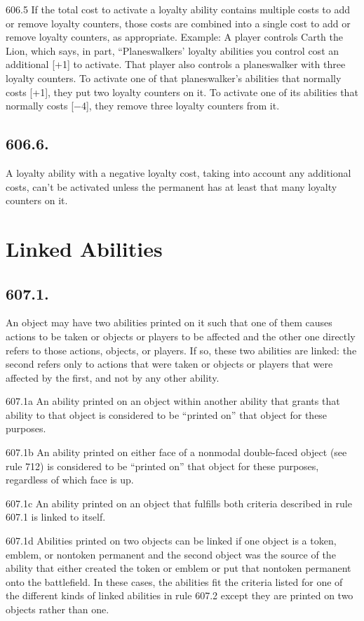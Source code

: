 606.5 If the total cost to activate a loyalty ability contains multiple costs to add or remove loyalty counters, those costs are combined into a single cost to add or remove loyalty counters, as appropriate.
Example: A player controls Carth the Lion, which says, in part, “Planeswalkers’ loyalty abilities you control cost an additional [+1] to activate. That player also controls a planeswalker with three loyalty counters. To activate one of that planeswalker’s abilities that normally costs [+1], they put two loyalty counters on it. To activate one of its abilities that normally costs [−4], they remove three loyalty counters from it.

\subsection*{606.6.}
A loyalty ability with a negative loyalty cost, taking into account any additional costs, can’t be activated unless the permanent has at least that many loyalty counters on it.

\section{Linked Abilities}
\subsection*{607.1.}
An object may have two abilities printed on it such that one of them causes actions to be taken or objects or players to be affected and the other one directly refers to those actions, objects, or players. If so, these two abilities are linked: the second refers only to actions that were taken or objects or players that were affected by the first, and not by any other ability.

607.1a An ability printed on an object within another ability that grants that ability to that object is considered to be “printed on” that object for these purposes.

607.1b An ability printed on either face of a nonmodal double-faced object (see rule 712) is considered to be “printed on” that object for these purposes, regardless of which face is up.

607.1c An ability printed on an object that fulfills both criteria described in rule 607.1 is linked to itself.

607.1d Abilities printed on two objects can be linked if one object is a token, emblem, or nontoken permanent and the second object was the source of the ability that either created the token or emblem or put that nontoken permanent onto the battlefield. In these cases, the abilities fit the criteria listed for one of the different kinds of linked abilities in rule 607.2 except they are printed on two objects rather than one.

